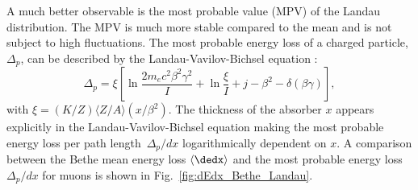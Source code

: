 A much better observable is the most probable value (MPV) of the Landau distribution.
The MPV is much more stable compared to the mean and is not subject to high \dedx fluctuations. 
The most probable energy loss of a charged particle, $\Delta_p$, can be described by the Landau-Vavilov-Bichsel equation \cite{bib:Bichsel:MPV_1988}:
\begin{equation}
\Delta_p = \xi \left[ \ln \frac{2m_e c^2\beta^2\gamma^2}{I}  + \ln\frac{\xi}{I} + j - \beta^2 - \delta(\beta\gamma)  \right],
\label{eq:Landau_Vavilov_Bichsel}
\end{equation}
with $\xi=(K/Z)\langle Z/A \rangle (x/\beta^2)$. 
The thickness of the absorber $x$ appears explicitly in the Landau-Vavilov-Bichsel equation making the most probable energy loss per path \mbox{length $\Delta_p/dx$} logarithmically dependent on $x$.
A comparison between the Bethe mean energy loss $\langle \dedx \rangle$ and the most probable energy loss $\Delta_p/dx$ for muons is shown in Fig.~\ref{fig:dEdx_Bethe_Landau}.

